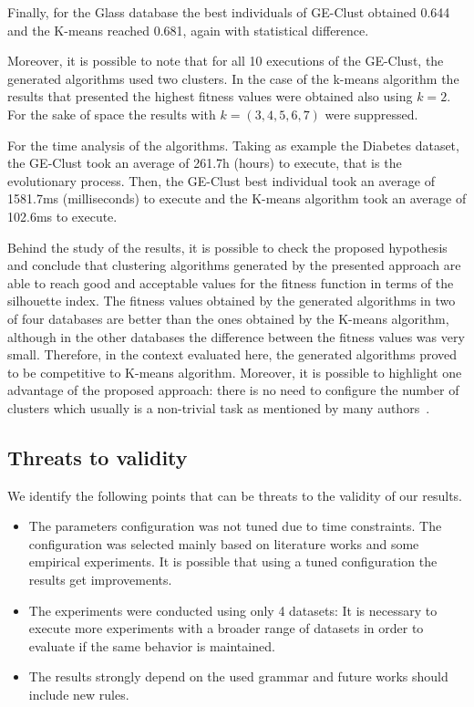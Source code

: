 \documentclass[conference,compsoc]{IEEEtran}
\begin{document}
Finally, for the Glass database the best individuals of GE-Clust obtained 0.644 and the K-means reached 0.681, again with statistical difference.


Moreover, it is possible to note that for all 10 executions of the GE-Clust, the generated algorithms used two clusters. In the case of the k-means algorithm the results that presented the highest fitness values were obtained also using $k=2$. For the sake of space the results with $k = (3,4,5,6,7)$ were suppressed.


For the time analysis of the algorithms. Taking as example the Diabetes dataset, the GE-Clust took an average of 261.7h (hours) to execute, that is the evolutionary process. Then, the GE-Clust best individual took an average of 1581.7ms (milliseconds) to execute and the K-means algorithm took an average of 102.6ms to execute.


Behind the study of the results, it is possible to check the proposed hypothesis and conclude that clustering algorithms generated by the presented approach are able to reach good and acceptable values for the fitness function in terms of  the silhouette index. The fitness values obtained by the generated algorithms in two of four databases are better than the ones obtained by the K-means algorithm, although in the other databases the difference between the fitness values was very small. Therefore, in the context evaluated here, the generated algorithms proved to be competitive to K-means algorithm. Moreover, it is possible to highlight one advantage of the proposed approach: there is no need to configure the number of clusters which usually is a non-trivial task as mentioned by many authors~\cite{pham2005selection, yan2005methods, tibshirani2001estimating}.


\subsection{Threats to validity}


We identify the following points that can be threats to the validity of our results.


\begin{itemize}
	\item The parameters configuration was not tuned due to time constraints. The configuration was selected mainly based on literature works and some empirical experiments. It is possible that using a tuned configuration the results get improvements.
	\item The experiments were conducted using only 4 datasets: It is necessary to execute more experiments with a broader range of datasets in order to evaluate if the same behavior is maintained.
	\item The results strongly depend on the used grammar and future works should include new rules.
\end{itemize}
\end{document}
